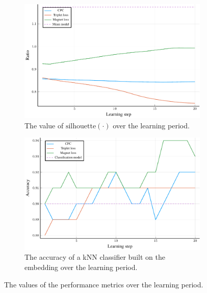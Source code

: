 \begin{figure}[h]
  \centering
  \begin{subfigure}[t]{0.49\textwidth}
    \centering
    \includegraphics[width=\textwidth]{images/cisco/ratio/cisco-ratio.pdf}
    \caption{The value of \( \mathrm{silhouette} \left( \cdot \right) \) over the learning period.}\label{fig:cisco-ratio}
  \end{subfigure}
  \hfill
  \begin{subfigure}[t]{0.49\textwidth}
    \centering
    \includegraphics[width=\textwidth]{images/cisco/accuracy/cisco-accuracy.pdf}
    \caption{The accuracy of a kNN classifier built on the embedding over the learning period.}\label{fig:cisco-accuracy}
  \end{subfigure}
  \caption{The values of the performance metrics over the learning period.}\label{fig:cisco}
\end{figure}


